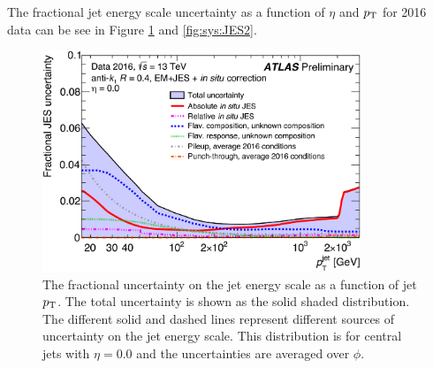 
\indent The fractional jet energy scale uncertainty as a function of $\eta$ and $\pt$ for 2016 data can be see in Figure \ref{fig:sys:JES1} and \ref{fig:sys:JES2}. \\

\begin{figure}[!h]
\begin{center}
\includegraphics[width=0.85\textwidth]{figures/JetCalib/JES_pt.png}
\caption[The fractional uncertainty on the jet energy scale vs jet $\pt$. ]{The fractional uncertainty on the jet energy scale as a function of jet $\pt$.  The total uncertainty is shown as the solid shaded distribution.  The different solid and dashed lines represent different sources of uncertainty on the jet energy scale. This distribution is for central jets with $\eta = 0.0$ and the uncertainties are averaged over $\phi$.}
\label{fig:sys:JES1}
\end{center}
\end{figure}

